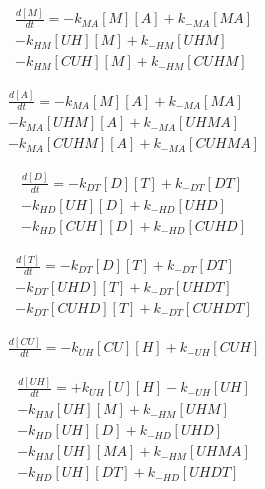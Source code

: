 \begin{equation}
\begin{split}
\frac{d[M]}{dt} = - k_{MA}[M][A] + k_{-MA}[MA]  \\%
                  - k_{HM}[UH][M] + k_{-HM}[UHM] \\%
                  - k_{HM}[CUH][M] + k_{-HM}[CUHM] %
\end{split}
\end{equation}

\begin{equation}
\begin{split}
\frac{d[A]}{dt} = - k_{MA}[M][A] + k_{-MA}[MA]\\ %
                  - k_{MA}[UHM][A] + k_{-MA}[UHMA] \\%
                  - k_{MA}[CUHM][A] + k_{-MA}[CUHMA] %
\end{split}
\end{equation}

\begin{equation}
\begin{split}
\frac{d[D]}{dt} = - k_{DT}[D][T] + k_{-DT}[DT] \\%
                  - k_{HD}[UH][D] + k_{-HD}[UHD] \\%
                  - k_{HD}[CUH][D] + k_{-HD}[CUHD] %
\end{split}
\end{equation}

\begin{equation}
\begin{split}
\frac{d[T]}{dt} = - k_{DT}[D][T] + k_{-DT}[DT] \\%
                  - k_{DT}[UHD][T] + k_{-DT}[UHDT] \\%
                  - k_{DT}[CUHD][T] + k_{-DT}[CUHDT] %
\end{split}
\end{equation}

\begin{equation}
\begin{split}
\frac{d[CU]}{dt} = - k_{UH}[CU][H] + k_{-UH}[CUH] %
\end{split}
\end{equation}

\begin{equation}
\begin{split}
\frac{d[UH]}{dt} = + k_{UH}[U][H] - k_{-UH}[UH] \\%
                   - k_{HM}[UH][M] + k_{-HM}[UHM] \\%
                   - k_{HD}[UH][D] + k_{-HD}[UHD] \\%
                   - k_{HM}[UH][MA] + k_{-HM}[UHMA] \\%
                   - k_{HD}[UH][DT] + k_{-HD}[UHDT] %
\end{split}
\end{equation}

